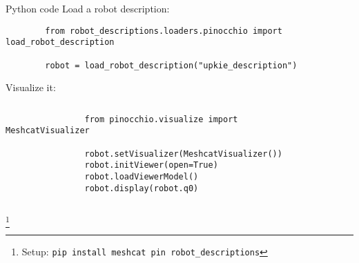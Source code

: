 \documentclass[9pt, aspectratio=43]{beamer}
\newcommand\blfootnote[1]{%
  \begingroup
  \renewcommand\thefootnote{}%
  \footnote{#1}%
  \addtocounter{footnote}{-1}%
  \endgroup
}
\begin{document}
\begin{frame}[fragile]{Python code}
    Load a robot description:
    \begin{verbatim}
        from robot_descriptions.loaders.pinocchio import load_robot_description

        robot = load_robot_description("upkie_description")
    \end{verbatim}
    Visualize it:
    \begin{columns}
        \begin{column}{0.75\columnwidth}
            \begin{verbatim}
                from pinocchio.visualize import MeshcatVisualizer

                robot.setVisualizer(MeshcatVisualizer())
                robot.initViewer(open=True)
                robot.loadViewerModel()
                robot.display(robot.q0)
            \end{verbatim}
        \end{column}
        \begin{column}{0.24\columnwidth}
            \begin{figure}
                \centering
            \end{figure}
        \end{column}
    \end{columns}
    \blfootnote{
        Setup: \texttt{pip install meshcat pin robot_descriptions}
    }
\end{frame}
\end{document}
